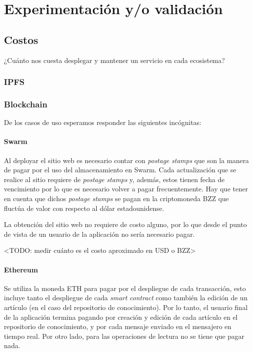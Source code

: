 \section{Experimentación y/o validación}

\subsection{Costos}
¿Cuánto nos cuesta desplegar y mantener un servicio en cada ecosistema?

\subsubsection{IPFS}

\subsubsection{Blockchain}


De los casos de uso esperamos responder las siguientes incógnitas: %

\paragraph{Swarm}
Al deployar el sitio web es necesario contar con \textit{postage stamps} que son la manera de pagar por el uso del almacenamiento en Swarm. Cada actualización que se realice al sitio requiere de \textit{postage stamps} y, además, estos tienen fecha de vencimiento por lo que es necesario volver a pagar frecuentemente. Hay que tener en cuenta que dichos \textit{postage stamps} se pagan en la criptomoneda BZZ que fluctúa de valor con respecto al dólar estadounidense.

La obtención del sitio web no requiere de costo alguno, por lo que desde el punto de vista de un usuario de la aplicación no sería necesario pagar.

<TODO: medir cuánto es el costo aproximado en USD o BZZ>

\paragraph{Ethereum}
Se utiliza la moneda ETH para pagar por el despliegue de cada transacción, esto incluye tanto el despliegue de cada \textit{smart contract} como también la edición de un artículo (en el caso del repositorio de conocimiento). Por lo tanto, el usuario final de la aplicación termina pagando por creación y edición de cada artículo en el repositorio de conocimiento, y por cada mensaje enviado en el mensajero en tiempo real. Por otro lado, para las operaciones de lectura no se tiene que pagar nada.

